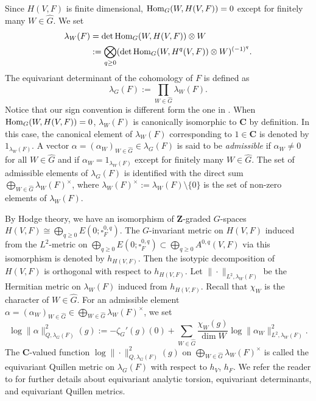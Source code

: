 \documentclass[amscd, leqno]{amsart}
\theoremstyle{plain}
\theoremstyle{definition}
\theoremstyle{remark}
\begin{document}
Since $H(V,F)$ is finite dimensional, ${\rm Hom}_{G}(W,H(V,F))=0$ except for finitely many $W\in\widehat{G}$. We set
$$
\begin{aligned}
\lambda_{W}(F) 
&= \det{\rm Hom}_{G}(W,H(V,F))\otimes W 
\\
&:= \bigotimes_{q\geq0}(\det {\rm Hom}_{G}(W,H^{q}(V,F))\otimes W)^{(-1)^{q}}.
\end{aligned}
$$
The equivariant determinant of the cohomology of $F$ is defined as
$$
\lambda_{G}(F):=\prod_{W\in\widehat{G}}\lambda_{W}(F).
$$
Notice that our sign convention is different form the one in \cite[Eq.\,(2.9)]{Bismut95}. 
When ${\rm Hom}_{G}(W,H(V,F))=0$, $\lambda_{W}(F)$ is canonically isomorphic to ${\mathbf C}$ by definition. 
In this case, the canonical element of $\lambda_{W}(F)$ corresponding to $1\in{\mathbf C}$ is denoted by $1_{\lambda_{W}(F)}$.
A vector $\alpha = (\alpha_{W})_{W\in\widehat{G}} \in \lambda_{G}(F)$ is said to be {\em admissible} 
if $\alpha_{W}\not=0$ for all $W\in\widehat{G}$ and if $\alpha_{W}=1_{\lambda_{W}(F)}$ except for finitely many $W\in\widehat{G}$. 
The set of admissible elements of $\lambda_{G}(F)$ is identified with the direct sum 
$\bigoplus_{W\in\widehat{G}}\lambda_{W}(F)^{\times}$, 
where $\lambda_{W}(F)^{\times}:=\lambda_{W}(F)\setminus\{0\}$ is the set of non-zero elements of $\lambda_{W}(F)$.
\par
By Hodge theory, we have an isomorphism of ${\mathbf Z}$-graded $G$-spaces $H(V,F) \cong \bigoplus_{q\geq0} E(0; \square_{F}^{0,q})$. 
The $G$-invariant metric on $H(V,F)$ induced from the $L^{2}$-metric on 
$\bigoplus_{q\geq0} E(0; \square_{F}^{0,q}) \subset \bigoplus_{q\geq 0} A^{0,q}(V,F)$ via this isomorphism is denoted by $h_{H(V,F)}$. 
Then the isotypic decomposition of $H(V,F)$ is orthogonal with respect to $h_{H(V,F)}$. 
Let $\|\cdot\|_{L^{2},\lambda_{W}(F)}$ be the Hermitian metric on $\lambda_{W}(F)$ induced from $h_{H(V,F)}$. 
Recall that $\chi_{W}$ is the character of $W\in\widehat{G}$. For an admissible element
$\alpha = (\alpha_{W})_{W\in\widehat{G}} \in \bigoplus_{W\in\widehat{G}}\lambda_{W}(F)^{\times}$, we set
$$
\log\|\alpha\|^{2}_{Q,\lambda_{G}(F)}(g) 
:= -\zeta_{G}'(g)(0) + \sum_{W\in\widehat{G}}\frac{\chi_{W}(g)}{\dim W} \log\|\alpha_{W}\|_{L^{2},\lambda_{W}(F)}^{2}.
$$
The ${\mathbf C}$-valued function $\log\|\cdot\|^{2}_{Q,\lambda_{G}(F)}(g)$ on $\bigoplus_{W\in\widehat{G}}\lambda_{W}(F)^{\times}$ 
is called the equivariant Quillen metric on $\lambda_{G}(F)$ with respect to $h_{V}$, $h_{F}$. 
We refer the reader to \cite{BGS88, Bismut95, KohlerRoessler01, Ma00} 
for further details about equivariant analytic torsion, equivariant determinants, and equivariant Quillen metrics.
\end{document}
